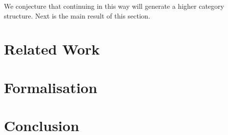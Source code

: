 \documentclass{article}
\theoremstyle{definition}
\theoremstyle{remark}
\begin{document}
We conjecture that continuing in this way will generate a higher category structure. Next is the main result of this section.




\section{Related Work}\label{sec:related}


\section{Formalisation}\label{sec:formalisation}


\section{Conclusion}\label{sec:conclusion}


\printbibliography{}
\end{document}
